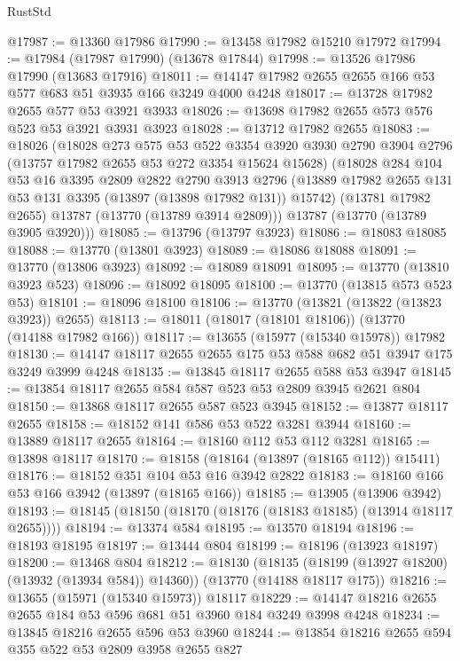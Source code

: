 \begin{lexlean}{RustStd}
\begin{coremodule}
@17987 := @13360 @17986
@17990 := @13458 @17982 @15210 @17972
@17994 := @17984 (@17987 @17990) (@13678 @17844)
@17998 := @13526 @17986 @17990 (@13683 @17916)
@18011 := @14147 @17982 @2655 @2655 @166 @53 @577 @683 @51 @3935 @166 @3249 @4000 @4248
@18017 := @13728 @17982 @2655 @577 @53 @3921 @3933
@18026 := @13698 @17982 @2655 @573 @576 @523 @53 @3921 @3931 @3923
@18028 := @13712 @17982 @2655
@18083 := @18026
    (@18028
      @273
      @575
      @53
      @522
      @3354
      @3920
      @3930
      @2790
      @3904
      @2796
      (@13757 @17982 @2655 @53 @272 @3354 @15624 @15628)
      (@18028
        @284
        @104
        @53
        @16
        @3395
        @2809
        @2822
        @2790
        @3913
        @2796
        (@13889 @17982 @2655 @131 @53 @131 @3395 (@13897 (@13898 @17982 @131)) @15742)
        (@13781 @17982 @2655)
        @13787
        (@13770 (@13789 @3914 @2809)))
      @13787
      (@13770 (@13789 @3905 @3920)))
@18085 := @13796 (@13797 @3923)
@18086 := @18083 @18085
@18088 := @13770 (@13801 @3923)
@18089 := @18086 @18088
@18091 := @13770 (@13806 @3923)
@18092 := @18089 @18091
@18095 := @13770 (@13810 @3923 @523)
@18096 := @18092 @18095
@18100 := @13770 (@13815 @573 @523 @53)
@18101 := @18096 @18100
@18106 := @13770 (@13821 (@13822 (@13823 @3923)) @2655)
@18113 := @18011 (@18017 (@18101 @18106)) (@13770 (@14188 @17982 @166))
@18117 := @13655 (@15977 (@15340 @15978)) @17982
@18130 := @14147 @18117 @2655 @2655 @175 @53 @588 @682 @51 @3947 @175 @3249 @3999 @4248
@18135 := @13845 @18117 @2655 @588 @53 @3947
@18145 := @13854 @18117 @2655 @584 @587 @523 @53 @2809 @3945 @2621 @804
@18150 := @13868 @18117 @2655 @587 @523 @3945
@18152 := @13877 @18117 @2655
@18158 := @18152 @141 @586 @53 @522 @3281 @3944
@18160 := @13889 @18117 @2655
@18164 := @18160 @112 @53 @112 @3281
@18165 := @13898 @18117
@18170 := @18158 (@18164 (@13897 (@18165 @112)) @15411)
@18176 := @18152 @351 @104 @53 @16 @3942 @2822
@18183 := @18160 @166 @53 @166 @3942 (@13897 (@18165 @166))
@18185 := @13905 (@13906 @3942)
@18193 := @18145 (@18150 (@18170 (@18176 (@18183 @18185) (@13914 @18117 @2655))))
@18194 := @13374 @584
@18195 := @13570 @18194
@18196 := @18193 @18195
@18197 := @13444 @804
@18199 := @18196 (@13923 @18197)
@18200 := @13468 @804
@18212 := @18130
    (@18135 (@18199 (@13927 @18200) (@13932 (@13934 @584)) @14360))
    (@13770 (@14188 @18117 @175))
@18216 := @13655 (@15971 (@15340 @15973)) @18117
@18229 := @14147 @18216 @2655 @2655 @184 @53 @596 @681 @51 @3960 @184 @3249 @3998 @4248
@18234 := @13845 @18216 @2655 @596 @53 @3960
@18244 := @13854 @18216 @2655 @594 @355 @522 @53 @2809 @3958 @2655 @827

\end{coremodule}
\end{lexlean}
